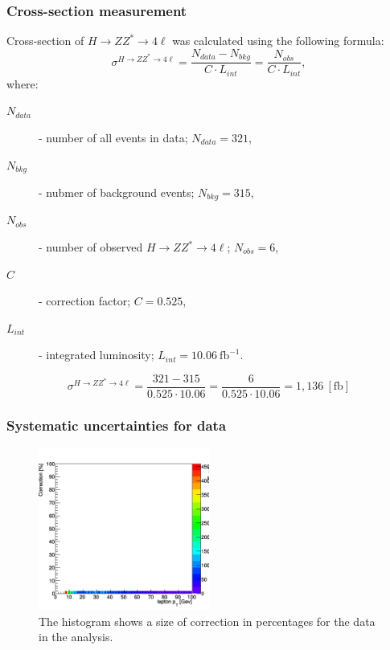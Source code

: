 \documentclass[aspectratio=1610, english]{beamer}
\newcommand{\hzz}{ H\rightarrow ZZ^{*}\rightarrow 4 \ell}
\begin{document}
\begin{frame}
\frametitle{Cross-section measurement}
Cross-section of $\hzz$ was calculated using the following formula:
\begin{equation}
\sigma^{\hzz}=\frac{N_{data}-N_{bkg}}{C\cdot L_{int}}=\frac{N_{obs}}{C\cdot L_{int}} ,
\end{equation}
where:
\begin{description}
\item[$N_{data}$] - number of all events in data; $N_{data}=321$,
\item[$N_{bkg}$] - nubmer of background events; $N_{bkg}=315$,
\item[$N_{obs}$] - number of observed $\hzz$; $N_{obs}=6$,
\item[$C$] - correction factor; $C=0.525$,
\item[$L_{int}$] - integrated luminosity; $L_{int}=10.06 \: \mathrm{fb}^{-1}$.
\end{description}
\vspace{1cm}
\begin{equation}
\sigma^{\hzz}=\frac{321-315}{0.525\cdot 10.06}=\frac{6}{0.525\cdot 10.06}=1,136 \: [\mathrm{fb}]
\end{equation}

\end{frame}

\begin{frame}
\frametitle{Systematic uncertainties for data}

\begin{figure} [H]
\centering
\includegraphics[width=0.5\textwidth]{syst1_data.png}
\caption{The histogram shows a size of correction in percentages for the data in the analysis. }
\end{figure}

\end{frame}
\end{document}

